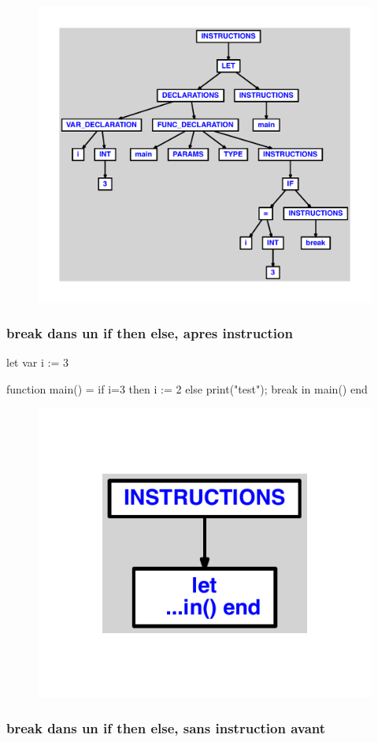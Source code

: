 \documentclass{article}
\begin{document}
\begin{figure}[H]\centering\includegraphics[max width=\textwidth]{ast/ast_17.pdf}\end{figure}\subsubsection{break dans un if then else, apres instruction}
\begin{verbatimtab}
let
	var i := 3

	function main() =
		if i=3 then
			i := 2
		else
			print("test");
			break
in main() end
\end{verbatimtab}
\begin{figure}[H]\centering\includegraphics[max width=\textwidth]{ast/ast_18.pdf}\end{figure}\subsubsection{break dans un if then else, sans instruction avant}
\end{document}
